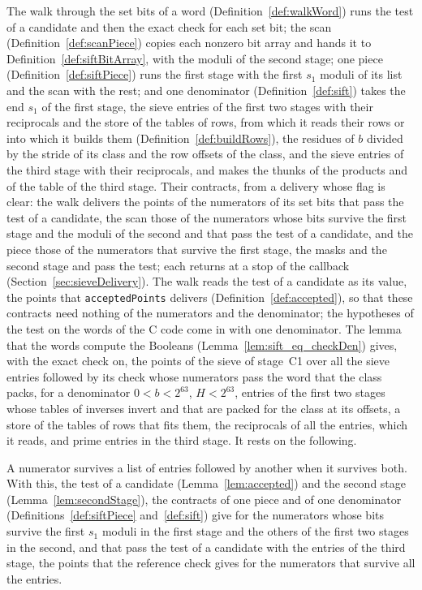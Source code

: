 The walk through the set bits of a word (Definition~\ref{def:walkWord}) runs the test of a candidate
and then the exact check for each set bit; the scan (Definition~\ref{def:scanPiece}) copies each
nonzero bit array and hands it to Definition~\ref{def:siftBitArray}, with the moduli of the second
stage; one piece (Definition~\ref{def:siftPiece}) runs the first stage with the first $s_1$ moduli
of its list and the scan with the rest; and one denominator (Definition~\ref{def:sift}) takes the
end $s_1$ of the first stage, the sieve entries of the first two stages with their reciprocals and
the store of the tables of rows, from which it reads their rows or into which it builds them
(Definition~\ref{def:buildRows}), the residues of $b$ divided by the stride of its class and the row
offsets of the class, and the sieve entries of the third stage with their reciprocals, and makes the
thunks of the products and of the table of the third stage. Their contracts, from a delivery whose
flag is clear: the walk delivers the points of the numerators of its set bits that pass the test of
a candidate, the scan those of the numerators whose bits survive the first stage and the moduli of
the second and that pass the test of a candidate, and the piece those of the numerators that survive
the first stage, the masks and the second stage and pass the test; each returns at a stop of the
callback (Section~\ref{sec:sieveDelivery}). The walk reads the test of a candidate as its value, the
points that \verb|acceptedPoints| delivers (Definition~\ref{def:accepted}), so that these contracts
need nothing of the numerators and the denominator; the hypotheses of the test on the words of the C
code come in with one denominator. The lemma that the words compute the Booleans
(Lemma~\ref{lem:sift_eq_checkDen}) gives, with the exact check on, the points of the sieve of
stage~C1 over all the sieve entries followed by its check whose numerators pass the word that the
class packs, for a denominator $0 < b < 2^{63}$, $H < 2^{63}$, entries of the first two stages whose
tables of inverses invert and that are packed for the class at its offsets, a store of the tables of
rows that fits them, the reciprocals of all the entries, which it reads, and prime entries in the
third stage. It rests on the following.

\begin{lemma}\label{lem:staged}
  \leanok
  A numerator survives a list of entries followed by another when it survives both. With this, the
  test of a candidate (Lemma~\ref{lem:accepted}) and the second stage (Lemma~\ref{lem:secondStage}),
  the contracts of one piece and of one denominator (Definitions~\ref{def:siftPiece}
  and~\ref{def:sift}) give for the numerators whose bits survive the first $s_1$ moduli in the first
  stage and the others of the first two stages in the second, and that pass the test of a candidate
  with the entries of the third stage, the points that the reference check gives for the numerators
  that survive all the entries.
\end{lemma}

